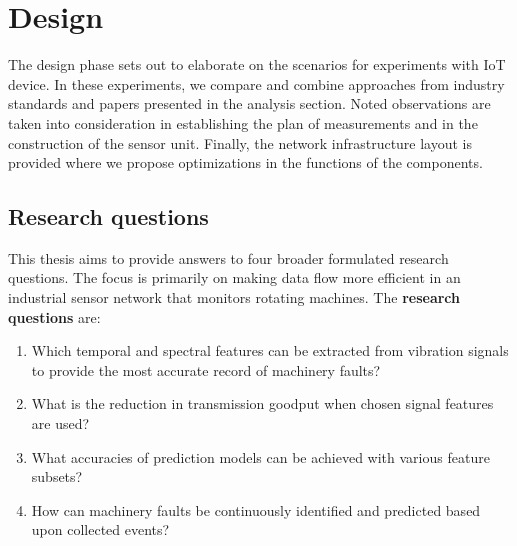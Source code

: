 \chapter{Design} \label{section:design}
The design phase sets out to elaborate on the scenarios for experiments with IoT device. In these experiments, we compare and combine approaches from industry standards and papers presented in the analysis section. Noted observations are taken into consideration in establishing the plan of measurements and in the construction of the sensor unit. Finally, the network infrastructure layout is provided where we propose optimizations in the functions of the components.

\section{Research questions}
This thesis aims to provide answers to four broader formulated research questions. The focus is primarily on making data flow more efficient in an industrial sensor network that monitors rotating machines. The \textbf{research questions} are:
\begin{enumerate}
    \itemsep0pt
	\item Which temporal and spectral features can be extracted from vibration signals to provide the most accurate record of machinery faults?
	\item What is the reduction in transmission goodput when chosen signal features are used?
	\item What accuracies of prediction models can be achieved with various feature subsets? 
	\item How can machinery faults be continuously identified and predicted based upon collected events?
\end{enumerate}

